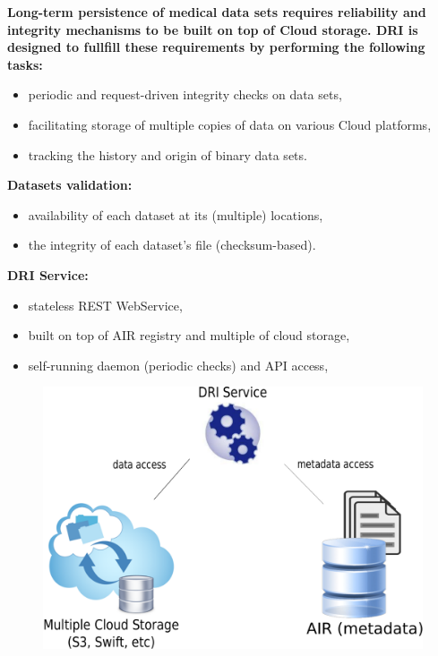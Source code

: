 \documentclass{beamer}
\begin{document}
\begin{frame}
\begin{block}{\textbf{Long-term persistence of medical data sets requires reliability and integrity mechanisms to be built on top of Cloud storage. DRI is designed to fullfill these requirements by performing the following tasks:}}
\begin{itemize}
	\item periodic and request-driven integrity checks on data sets,
	\item facilitating storage of multiple copies of data on various Cloud platforms,
	\item tracking the history and origin of binary data sets.
\end{itemize}
\end{block}
\begin{exampleblock}{\textbf{Datasets validation:}}
\begin{itemize}
	\item availability of each dataset at its (multiple) locations,
	\item the integrity of each dataset's file (checksum-based).
\end{itemize}
\end{exampleblock}
\end{frame}

\begin{frame}
\begin{block}{\textbf{DRI Service:}}
\begin{itemize}
	\item stateless REST WebService,
	\item built on top of AIR registry and multiple of cloud storage,
	\item self-running daemon (periodic checks) and API access,
\end{itemize}
\end{block}
\begin{figure}
\centering
\includegraphics[scale=0.28]{schemat.pdf}
\end{figure}
\end{frame}
\end{document}
